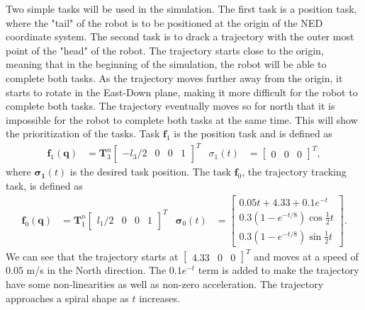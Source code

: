 Two simple tasks will be used in the simulation. The first task is a position
task, where the "tail" of the robot is to be positioned at the origin of the
NED coordinate system. The second task is to drack a trajectory with the outer
most point of the "head" of the robot. The trajectory starts close to the origin,
meaning that in the beginning of the simulation, the robot will be able to
complete both tasks. As the trajectory moves further away from the origin, it
starts to rotate in the East-Down plane, making it more difficult for the robot
to complete both tasks. The trajectory eventually moves so for north that it
is impossible for the robot to complete both tasks at the same time. This
will show the prioritization of the tasks. Task $\bm{f}_1$ is the position task
and is defined as
\begin{align}
    \bm{f}_1(\bm{q}) &= \bm{T}_3^n \begin{bmatrix} -l_3/2 & 0 & 0 & 1 \end{bmatrix}^T &
        \sigma_1(t) &= \begin{bmatrix} 0 & 0 & 0 \end{bmatrix}^T,
\end{align}
where $\bm{\sigma_1}(t)$ is the desired task position. The task $\bm{f}_0$, the
trajectory tracking task, is defined as
\begin{align}
    \bm{f}_0(\bm{q}) &= \bm{T}_1^n \begin{bmatrix} l_1/2 & 0 & 0 & 1 \end{bmatrix}^T &
        \bm{\sigma}_0(t) &= \begin{bmatrix}
            0.05t + 4.33 + 0.1e^{-t} \\
            0.3 \left(1-e^{-t/8}\right)\cos{\frac{1}{2}t} \\
            0.3 \left(1-e^{-t/8}\right)\sin{\frac{1}{2}t}
        \end{bmatrix}.
\end{align}
We can see that the trajectory starts at $\begin{bmatrix} 4.33 & 0 & 0 \end{bmatrix}^T$
and moves at a speed of $0.05$ m/s in the North direction. The $0.1e^{-t}$ term
is added to make the trajectory have some non-linearities as well as
non-zero acceleration. The trajectory approaches a spiral shape as $t$ increases.


